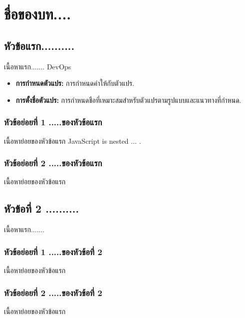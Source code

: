 \chapter{ชื่อของบท....}

\section{หัวข้อแรก..........}
เนื้อหาแรก....... \Gls{DevOps}

\begin{tcolorbox}[colframe=gray!60, colback=gray!6, title=แนวคิดสำคัญ:]
\begin{itemize}
\item{ {\bf การกำหนดตัวแปร:} การกำหนดค่าให้กับตัวแปร.}
\item{ {\bf การตั้งชื่อตัวแปร:} การกำหนดชือที่เหมาะสมสำหรับตัวแปรตามรูปแบบและแนวทางที่กำหนด.}
\end{itemize}
\end{tcolorbox}


\subsection{หัวข้อย่อยที่ 1 .....ของหัวข้อแรก}
เนื้อหาย่อยของหัวข้อแรก  JavaScript   is nested ... .\textcite{flanagan2016javascript}

\subsection{หัวข้อย่อยที่ 2 .....ของหัวข้อแรก}
เนื้อหาย่อยของหัวข้อแรก


\section{หัวข้อที่ 2 ..........}
เนื้อหาแรก.......

\subsection{หัวข้อย่อยที่ 1 .....ของหัวข้อที่ 2}
เนื้อหาย่อยของหัวข้อแรก

\subsection{หัวข้อย่อยที่ 2 .....ของหัวข้อที่ 2}
เนื้อหาย่อยของหัวข้อแรก

